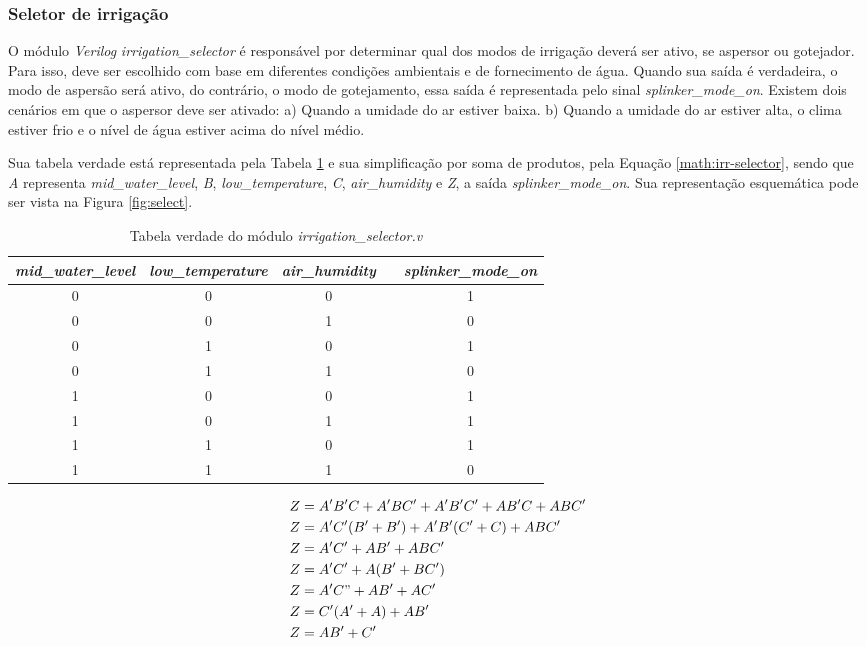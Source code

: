 \documentclass[
	article,			%
	11pt,				%
	oneside,			%
	a4paper,			%
	english,			%
	brazil,				%
	sumario=tradicional
	]{abntex2}
\begin{document}
\subsubsection{Seletor de irrigação}

O módulo \textit{Verilog} \textit{irrigation\_selector} é responsável por determinar qual dos modos de irrigação deverá ser ativo, se aspersor ou gotejador. 
Para isso, deve ser escolhido com base em diferentes condições ambientais e de fornecimento de água. 
Quando sua saída é verdadeira, o modo de aspersão será ativo, do contrário, o modo de gotejamento, essa saída é representada pelo sinal \textit{splinker\_mode\_on}. Existem dois cenários em que o aspersor deve ser ativado:
a) Quando a umidade do ar estiver baixa.
b) Quando a umidade do ar estiver alta, o clima estiver frio e o nível de água estiver acima do nível médio.

Sua tabela verdade está representada pela Tabela \ref{tab:irrigation-selector} e sua simplificação por soma de produtos, pela Equação \eqref{math:irr-selector}, sendo que \textit{A} representa \textit{mid\_water\_level}, \textit{B}, \textit{low\_temperature}, \textit{C}, \textit{air\_humidity} e \textit{Z}, a saída \textit{splinker\_mode\_on}. Sua representação esquemática pode ser vista na Figura \ref{fig:select}.


\begin{table}[h]
\centering
\begin{tabular}{|c|c|c|l|c|}
\hline
\textit{mid\_water\_level} & \multicolumn{1}{l|}{\textit{low\_temperature}} & \textit{air\_humidity} &  & \textit{splinker\_mode\_on} \\ \hline
0 & 0 & 0 &  & 1 \\ \hline
0 & 0 & 1 &  & 0 \\ \hline
0 & 1 & 0 &  & 1 \\ \hline
0 & 1 & 1 &  & 0 \\ \hline
1 & 0 & 0 &  & 1 \\ \hline
1 & 0 & 1 &  & 1 \\ \hline
1 & 1 & 0 &  & 1 \\ \hline
1 & 1 & 1 &  & 0 \\ \hline
\end{tabular}
\caption{Tabela verdade do módulo \textit{irrigation\_selector.v}}
\label{tab:irrigation-selector}
\end{table}



\begin{equation}
\begin{split}
Z &= A'B'C + A'BC' + A'B'C' + AB'C + ABC' \\
Z &= A'C'(B' + B') + A'B'(C' + C) + ABC' \\
Z &= A'C' + AB' + ABC' \\
Z &= A'C' + A(B' + BC') \\
Z &= A'C" + AB' + AC'\\
Z & = C'(A' + A) + AB'\\
Z &= AB' + C'
\label{math:irr-selector}
\end{split}
\end{equation}
\end{document}
